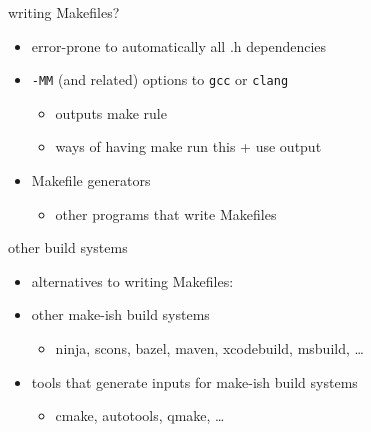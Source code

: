 \begin{frame}{writing Makefiles?}
\begin{itemize}
\item error-prone to automatically all .h dependencies
\vspace{.5cm}
\item \texttt{-MM} (and related) options to \texttt{gcc} or \texttt{clang}
    \begin{itemize}
    \item outputs make rule
    \item ways of having make run this + use output
    \end{itemize}
\item Makefile generators
    \begin{itemize}
    \item other programs that write Makefiles
    \end{itemize}
\end{itemize}
\end{frame}

\begin{frame}{other build systems}
\begin{itemize}
\item alternatives to writing Makefiles:
\vspace{.25cm}
\item other make-ish build systems
    \begin{itemize}
    \item ninja, scons, bazel, maven, xcodebuild, msbuild, \ldots
    \end{itemize}
\item tools that generate inputs for make-ish build systems
    \begin{itemize}
    \item cmake, autotools, qmake, \ldots
    \end{itemize}
\end{itemize}
\end{frame}
